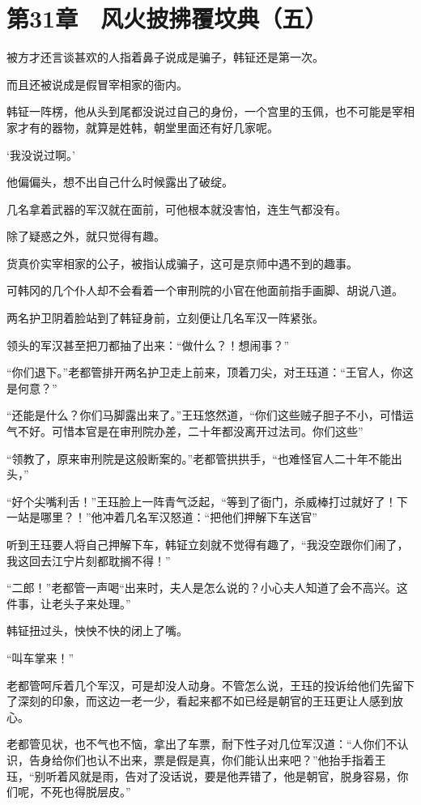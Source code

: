 \section{第31章　风火披拂覆坟典（五）}

被方才还言谈甚欢的人指着鼻子说成是骗子，韩钲还是第一次。

而且还被说成是假冒宰相家的衙内。

韩钲一阵楞，他从头到尾都没说过自己的身份，一个宫里的玉佩，也不可能是宰相家才有的器物，就算是姓韩，朝堂里面还有好几家呢。

‘我没说过啊。’

他偏偏头，想不出自己什么时候露出了破绽。

几名拿着武器的军汉就在面前，可他根本就没害怕，连生气都没有。

除了疑惑之外，就只觉得有趣。

货真价实宰相家的公子，被指认成骗子，这可是京师中遇不到的趣事。

可韩冈的几个仆人却不会看着一个审刑院的小官在他面前指手画脚、胡说八道。

两名护卫阴着脸站到了韩钲身前，立刻便让几名军汉一阵紧张。

领头的军汉甚至把刀都抽了出来：“做什么？！想闹事？”

“你们退下。”老都管排开两名护卫走上前来，顶着刀尖，对王珏道：“王官人，你这是何意？”

“还能是什么？你们马脚露出来了。”王珏悠然道，“你们这些贼子胆子不小，可惜运气不好。可惜本官是在审刑院办差，二十年都没离开过法司。你们这些”

“领教了，原来审刑院是这般断案的。”老都管拱拱手，“也难怪官人二十年不能出头，”

“好个尖嘴利舌！”王珏脸上一阵青气泛起，“等到了衙门，杀威棒打过就好了！下一站是哪里？！”他冲着几名军汉怒道：“把他们押解下车送官”

听到王珏要人将自己押解下车，韩钲立刻就不觉得有趣了，“我没空跟你们闹了，我这回去江宁片刻都耽搁不得！”

“二郎！”老都管一声喝“出来时，夫人是怎么说的？小心夫人知道了会不高兴。这件事，让老头子来处理。”

韩钲扭过头，怏怏不快的闭上了嘴。

“叫车掌来！”

老都管呵斥着几个军汉，可是却没人动身。不管怎么说，王珏的投诉给他们先留下了深刻的印象，而这边一老一少，看起来都不如已经是朝官的王珏更让人感到放心。

老都管见状，也不气也不恼，拿出了车票，耐下性子对几位军汉道：“人你们不认识，告身给你们也认不出来，票是假是真，你们能认出来吧？”他抬手指着王珏，“别听着风就是雨，告对了没话说，要是他弄错了，他是朝官，脱身容易，你们呢，不死也得脱层皮。”

